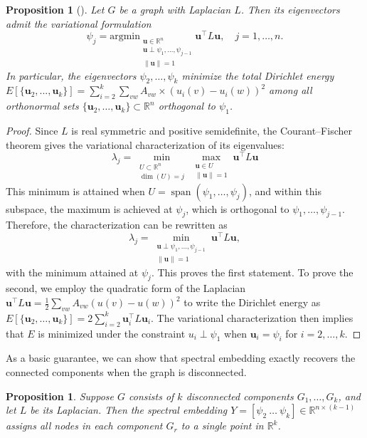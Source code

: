 \documentclass[reprint,onecolumn]{article}
\newtheorem{proposition}[theorem]{Proposition}
\newcommand{\R}{\mathbb{R}}
\newcommand{\1}{\mathbb{1}}
\renewcommand{\u}{\mathbf{u}}
\newcommand{\0}{\mathbf{0}}
\begin{document}
\begin{proposition}[\cite{horn2012matrix}]
Let $G$ be a graph with Laplacian $L$. Then its eigenvectors admit the variational formulation
\[
\psi_j = \textrm{argmin}_{\substack{\u \in \R^n \\ \u \perp \psi_1,\dots,\psi_{j-1} \\ \|\u\|=1}} \u^\top L \u, \quad j = 1, \dots, n.
\]
In particular, the eigenvectors $\psi_2, \dots, \psi_k$ minimize the total Dirichlet energy
\(
E[\{\u_2,...,\u_k\}] = \sum_{i=2}^k \sum_{vw}  A_{vw} \times \allowbreak (u_i(v) - u_i(w))^2
\)
among all orthonormal sets \( \{\u_2, \dots, \u_k\} \subset \mathbb{R}^n \) orthogonal to \( \psi_1 \).
\end{proposition}

\begin{proof}
Since $L$ is real symmetric and positive semidefinite, the Courant--Fischer theorem gives the variational characterization of its eigenvalues:
\[
\lambda_j = \min_{\substack{U \subset \R^n \\ \dim(U) = j}} \max_{\substack{\u \in U \\ \|\u\| = 1}} \u^\top L \u 
\]
This minimum is attained when \( U = \operatorname{span}(\psi_1, \dots, \psi_j) \), and within this subspace, the maximum is achieved at \( \psi_j \), which is orthogonal to \( \psi_1, \dots, \psi_{j-1} \). Therefore, the characterization can be rewritten as
\[
\lambda_j = \min_{\substack{\u \perp \psi_1,\dots,\psi_{j-1} \\ \|\u\| = 1}} \u^\top L \u,
\]
with the minimum attained at $\psi_j$. This proves the first statement. To prove the second, we employ the quadratic form of the Laplacian
\(\u^\top L \u = \frac1{2} \sum_{vw} A_{vw} (u(v)-u(w))^2 
\)
to write the Dirichlet energy as
\(
E[\{\u_2, \dots, \u_k\}] = 2 \sum_{i=2}^k \u_i^\top L \u_i.
\)
The variational characterization then implies that $E$ is minimized under the constraint $u_i \perp \psi_1$ when \( \u_i = \psi_i \) for \( i = 2, \dots, k \).
\end{proof}
As a basic guarantee, we can show that spectral embedding exactly recovers the connected components when the graph is disconnected.
\begin{proposition}
Suppose $G$ consists of $k$ disconnected components $G_1,\dots,G_k$, and let $L$ be its Laplacian. Then the spectral embedding \( Y = [\psi_2 \ \dots \ \psi_k] \in \mathbb{R}^{n \times (k-1)} \) assigns all nodes in each component $G_r$ to a single point in $\R^{k}$.
\end{proposition}
\end{document}
